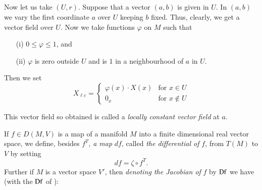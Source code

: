 \subsection{}\label{chap0:0.1.11}

Now let us take $(U,r)$. Suppose that a vector $(a,b)$ is given in
$U$. In $(a,b)$ we vary the first coordinate $a$ over $U$ keeping $b$
fixed. Thus, clearly, we get a vector field over
$U$. Now \pageoriginale we take 
functions $\varphi$ on $M$ such that
\begin{itemize}
\item[(i)] $0\leq \varphi\leq 1$, and

\item[(ii)] $\varphi$ is zero outside $U$ and is $1$ in a
  neighbourhood of $a$ in $U$.
\end{itemize}

Then we set
$$
X_{\ell c}=
\begin{cases}
\varphi(x)\cdot X(x) & \text{for \ } x\in U\\
0_{x} & \text{for \ } x\not\in U
\end{cases}
$$

This vector field so obtained is called a {\em locally constant vector
  field} at $a$.

If $f\in D(M,V)$ is a map of a manifold $M$ into a finite dimensional
real vector space, we define, besides $f^{T}$, {\em a map} $df$,
called {\em the differential of} $f$, from $T(M)$ to $V$ by setting
\begin{equation*}\label{chap0:0.1.12}
df = \zeta\circ f^{T}.\tag{0.1.12}
\end{equation*}
Further if $M$ is a vector space $V'$, then {\em denoting the Jacobian
  of} $f$ by $\operatorname{Df}$ we have (with the $\operatorname{Df}$ of \cite{36}):

\setcounter{subsection}{12}
